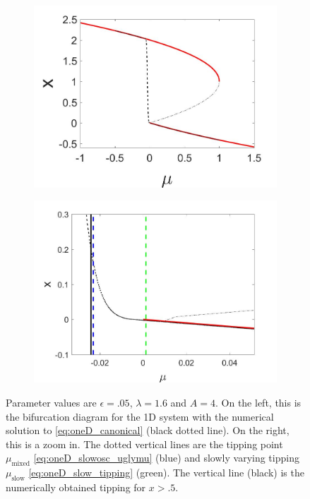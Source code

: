 \begin{figure}[H]
\centering
\begin{subfigure}{.5\textwidth}
  \centering
  \includegraphics[width=\linewidth]{oneD/slowosc_bif_diagram_large.jpg}
  \caption{}
\end{subfigure}%
\begin{subfigure}{.5\textwidth}
  \centering
  \includegraphics[width=\linewidth]{oneD/slowosc_bif_diagram_large_zoom.jpg}
  \caption{}
\end{subfigure}
\caption{Parameter values are $\epsilon=.05$, $\lambda=1.6$ and $A=4$. On the left, this is the bifurcation diagram for the 1D system with the numerical solution to \eqref{eq:oneD_canonical} (black dotted line). On the right, this is a zoom in. The dotted vertical lines are the tipping point $\mu_{\text{mixed}}$ \eqref{eq:oneD_slowosc_uglymu} (blue) and slowly varying tipping $\mu_{\text{slow}}$ \eqref{eq:oneD_slow_tipping} (green). The vertical line (black) is the numerically obtained tipping for $x>.5$.}
\label{fig:oneD_slowosc_numerical_large}
\end{figure}

